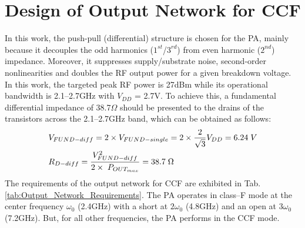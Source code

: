 \documentclass[conference]{IEEEtran}
\begin{document}
 

\section{Design of Output Network for CCF}
\label{section:ON}
In this work, the push-pull (differential) structure is chosen for the PA, mainly because it decouples the odd harmonics ($1^{st}$/$3^{rd}$) from even harmonic ($2^{nd}$) impedance. Moreover, it suppresses supply/substrate noise, second-order nonlinearities and doubles the RF output power for a given breakdown voltage. 
In this work, the targeted peak RF power is 27dBm  while its operational bandwidth is 2.1--2.7GHz with $V_{DD}$ = 2.7V. To achieve this, a  fundamental differential impedance of 38.7$\Omega$ should be presented to the drains of the transistors across the 2.1--2.7GHz band, which can be obtained as follows:
\vspace{-0.05in}
\begin{equation}
\begin{aligned}
&V_{FUND-diff}=2\times V_{FUND-single}=2\times\frac{2}{\sqrt{3}} V_{DD}=6.24 \hspace{1mm}V\\
&R_{D-diff}=\frac{V_{FUND-diff}^{2}}{2\times\hspace{1mm} P_{OUT_{max}}}=38.7 \hspace{1mm} \Omega
\label{eqn_diff_imp}
\end{aligned}
\end{equation}
The requirements of the output network for CCF are exhibited in Tab. \ref{tab:Output_Network_Requirements}. The PA operates in class--F mode at the center frequency $\omega_0$ (2.4GHz) with a short at $2\omega_0$ (4.8GHz) and an open at $3\omega_0$ (7.2GHz). But, for all other frequencies, the PA performs in the CCF mode. 
\end{document}
